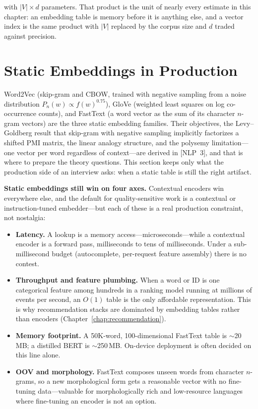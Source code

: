 with $|V| \times d$ parameters. That product is the unit of nearly every estimate in this chapter: an embedding table is memory before it is anything else, and a vector index is the same product with $|V|$ replaced by the corpus size and $d$ traded against precision.

\section{Static Embeddings in Production}
\label{sec:word_embeddings}

Word2Vec (skip-gram and CBOW, trained with negative sampling from a noise distribution $P_n(w) \propto f(w)^{0.75}$), GloVe (weighted least squares on log co-occurrence counts), and FastText (a word vector as the sum of its character $n$-gram vectors) are the three static embedding families. Their objectives, the Levy--Goldberg result that skip-gram with negative sampling implicitly factorizes a shifted PMI matrix, the linear analogy structure, and the polysemy limitation---one vector per word regardless of context---are derived in [NLP~3], and that is where to prepare the theory questions. This section keeps only what the production side of an interview asks: when a static table is still the right artifact.

\textbf{Static embeddings still win on four axes.} Contextual encoders win everywhere else, and the default for quality-sensitive work is a contextual or instruction-tuned embedder---but each of these is a real production constraint, not nostalgia:

\begin{itemize}
    \item \textbf{Latency.} A lookup is a memory access---microseconds---while a contextual encoder is a forward pass, milliseconds to tens of milliseconds. Under a sub-millisecond budget (autocomplete, per-request feature assembly) there is no contest.
    \item \textbf{Throughput and feature plumbing.} When a word or ID is one categorical feature among hundreds in a ranking model running at millions of events per second, an $O(1)$ table is the only affordable representation. This is why recommendation stacks are dominated by embedding tables rather than encoders (Chapter~\ref{chap:recommendation}).
    \item \textbf{Memory footprint.} A 50K-word, 100-dimensional FastText table is $\sim$20\,MB; a distilled BERT is $\sim$250\,MB. On-device deployment is often decided on this line alone.
    \item \textbf{OOV and morphology.} FastText composes unseen words from character $n$-grams, so a new morphological form gets a reasonable vector with no fine-tuning data---valuable for morphologically rich and low-resource languages where fine-tuning an encoder is not an option.
\end{itemize}

